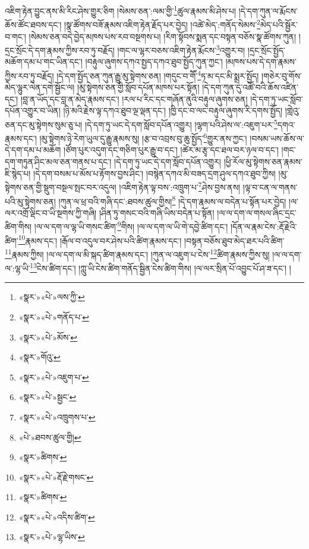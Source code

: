 འཇིག་རྟེན་བྱུང་ནས་མི་རིང་ཤེས་གྱུར་ཅིག །སེམས་ཅན་:ལམ་གྱི་\footnote{«སྣར་»«པེ་»ལས་ཀྱི་}ཚུལ་རྣམས་མི་ཤེས་པ། །དེ་དག་ཀུན་ལ་རྨོངས་ཆོས་ཚོང་ཐབས་དང་། །སྣ་ཚོགས་བཟོ་རྣམས་འཇིག་རྟེན་རྗོད་པར་བྱེད། །འཚེ་མེད་:གནོད་སེམས་\footnote{«སྣར་»«པེ་»གནོད་པ་}མེད་པའི་སྦྱོར་བ་གང་། །སེམས་ཅན་བདེ་བྱེད་མཁས་པས་རབ་བསྔགས་པ། །རིག་སྟོབས་སྨན་དང་བསྟན་བཅོས་སྣ་ཚོགས་ཀུན། །དྲང་སྲོང་དེ་དག་རྣམས་ཀྱིས་རབ་ཏུ་བརྗོད། །གང་ལ་ལྷར་བཅས་འཇིག་རྟེན་རྨོངས་\footnote{«སྣར་»«པེ་»མོས་}འགྱུར་བ། །དྲང་སྲོང་སྤྱོད་མཆོག་དམ་པ་གང་ཡིན་དང་། །བརྟུལ་ཞུགས་དཀའ་སྤྱད་དཀའ་ཐུབ་སྤྱོད་ཀུན་ཀྱང་། །མཁས་པས་དེ་དག་རྣམས་ཀྱིས་རབ་ཏུ་བརྗོད། །དེ་དག་སྤྱོད་ཅན་ཀུན་རྒྱུ་མུ་སྟེགས་ཅན། །གདུང་བ་གཽ་\footnote{«སྣར་»གོའུ་}ཏ་མ་དང་མི་སྨྲར་སྤྱོད། །གཅེར་བུ་གོས་མེད་ལྷུར་ལེན་དགེ་སྦྱོང་ལ། །མུ་སྟེགས་ཅན་གྱི་སློབ་དཔོན་མཁས་པར་སྟོན། །དེ་དག་ཀུན་དུ་འཚོ་བའི་ཆོས་འཛིན་དང་། །བླ་ན་ཡོད་དང་བླ་ན་མེད་རྣམས་དང་། །རལ་པ་རིང་དང་གཞོན་ནུའི་བརྟུལ་ཞུགས་ཅན། །དེ་དག་ཏུ་ཡང་སློབ་དཔོན་འགྱུར་བ་ཡིན། །ཉི་མའི་རྗེས་ལྟ་དཀའ་ཐུབ་ལྔ་ལྡན་དང་། །ཁྱི་དང་བ་ལང་བརྟུལ་ཞུགས་རི་དགས་སྤྱོད། །གླེའུ་ཅན་དང་མུ་སྟེགས་སུམ་ཅུ་པ། །དེ་དག་ཏུ་ཡང་དེ་དག་སློབ་དཔོན་འགྱུར། །ལྷག་པའི་ཤེས་ལ་:འཇུག་པར་\footnote{«སྣར་»«པེ་»འཇུག་པ་}དགའ་རྣམས་དང་། །མུ་སྟེགས་ཉེ་རེག་ཡུལ་དུ་རྒྱུ་རྣམས་སུ། །རྩ་བ་འབྲས་བུ་ཆུ་སྤྱོད་\footnote{«སྣར་»«པེ་»སྦྱང་}གྱུར་ནས་ཀྱང་། །བསམ་ཡས་ཆོས་ལ་དེ་དག་དམ་པ་མཆོག །ཙོག་པུར་འདུག་དང་གཅིག་པུར་རྒྱུ་བ་དང་། །ཚེར་མ་རྩྭ་དང་ཐལ་བར་ཉལ་བ་དང་། །གང་དག་གཏུན་ཤིང་མལ་ཅན་གནས་པ་དང་། །དེ་དག་ཏུ་ཡང་དེ་དག་སློབ་དཔོན་འགྱུར། །ཕྱི་རོལ་མུ་སྟེགས་ཅན་རྣམས་ཇི་སྙེད་པ། །དེ་དག་བསམ་པ་མོས་པ་རྟོགས་བྱས་ཤིང་། །བསྙེན་དཀའ་མི་བཟད་དྲག་ཤུལ་དཀའ་ཐུབ་ཀྱིས། །མུ་སྟེགས་ཅན་གྱི་སྡུག་བསྔལ་སྤང་བར་འདུལ། །འཇིག་རྟེན་ལྟ་བས་:འཁྲུག་པ་\footnote{«སྣར་»«པེ་»འཁྲུགས་པ་}ཤེས་བྱས་ནས། །ལྟ་བ་ངན་ལ་གནས་པའི་མུ་སྟེགས་ཅན། །ཀུན་ལ་ཕྲ་བའི་གཞི་དང་:ཐབས་ཚུལ་གྱིས།\footnote{«པེ་»ཐབས་ཚུལ་གྱི།} །དེ་དག་རྣམས་ལ་བདེན་པ་སྟོན་པར་བྱེད། །ལ་ལར་འགྲོ་ལྡིང་བ་ཡི་སྔགས་ཀྱི་གཞི། །ཤིན་ཏུ་གསང་བའི་གཞི་ཡིས་བདེན་པ་སྟོན། །ལ་ལ་དག་ལ་གསལ་ཞིང་དྲང་ཚིག་གིས། །ལ་ལ་དག་ལ་ལྷ་ཡི་གསང་ཚིག་\footnote{«སྣར་»ཚིགས་}གིས། །ལ་ལ་དག་ལ་ཡི་གེ་དབྱེ་ཚིག་དང་། །དོན་ལ་རྣམ་ངེས་:རྡོ་རྗེའི་ཚིག་\footnote{«སྣར་»«པེ་»རྡོ་རྗེ་གསང་}རྣམས་དང་། །རྒོལ་བ་འདུལ་བར་ཤེས་པའི་ཚིག་རྣམས་དང་། །བསྟན་བཅོས་ཐུབ་མེད་ཐར་པའི་ཚིག་\footnote{«སྣར་»ཚིགས་}རྣམས་ཀྱིས། །ལ་ལ་དག་ལ་མི་སྐད་ཚིག་རྣམས་དང་། །ཀུན་ལ་འཇུག་པ་ངེས་\footnote{«སྣར་»«པེ་»འདིས་ཚིག་}ཚིག་རྣམས་ཀྱིས་སུ། །ལ་ལ་དག་ལ་:ལྷ་ཡི་\footnote{«སྣར་»«པེ་»ལྷ་ཡིས་}ངེས་ཚིག་དང་། །ཀླུ་ཡི་ངེས་ཚིག་གནོད་སྦྱིན་ངེས་ཚིག་གིས། །ལ་ལར་སྲིན་པོ་འབྱུང་པོ་ཤ་ཟ་དང་། །
